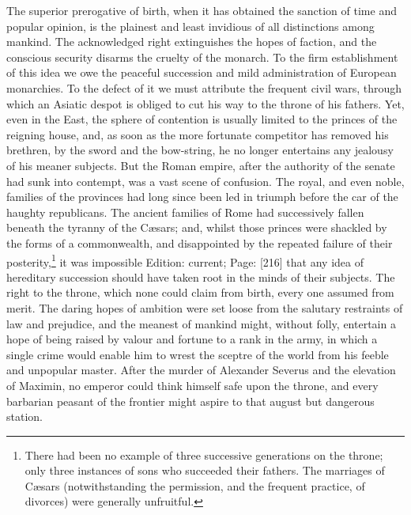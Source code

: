 The superior prerogative of birth, when it has obtained the sanction of time and popular opinion, is the plainest and least invidious of all distinctions among mankind. The acknowledged right extinguishes the hopes of faction, and the conscious security disarms the cruelty of the monarch. To the firm establishment of this idea we owe the peaceful succession and mild administration of European monarchies. To the defect of it we must attribute the frequent civil wars, through which an Asiatic despot is obliged to cut his way to the throne of his fathers. Yet, even in the East, the sphere of contention is usually limited to the princes of the reigning house, and, as soon as the more fortunate competitor has removed his brethren, by the sword and the bow-string, he no longer entertains any jealousy of his meaner subjects. But the Roman empire, after the authority of the senate had sunk into contempt, was a vast scene of confusion. The royal, and even noble, families of the provinces had long since been led in triumph before the car of the haughty republicans. The ancient families of Rome had successively fallen beneath the tyranny of the Cæsars; and, whilst those princes were shackled by the forms of a commonwealth, and disappointed by the repeated failure of their posterity,\footnote{There had been no example of three successive generations on the throne; only three instances of sons who succeeded their fathers. The marriages of Cæsars (notwithstanding the permission, and the frequent practice, of divorces) were generally unfruitful.} it was impossible Edition: current; Page: [216] that any idea of hereditary succession should have taken root in the minds of their subjects. The right to the throne, which none could claim from birth, every one assumed from merit. The daring hopes of ambition were set loose from the salutary restraints of law and prejudice, and the meanest of mankind might, without folly, entertain a hope of being raised by valour and fortune to a rank in the army, in which a single crime would enable him to wrest the sceptre of the world from his feeble and unpopular master. After the murder of Alexander Severus and the elevation of Maximin, no emperor could think himself safe upon the throne, and every barbarian peasant of the frontier might aspire to that august but dangerous station.

